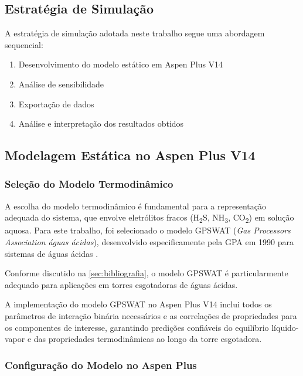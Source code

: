 \documentclass[10pt,a4paper]{article}
\begin{document}
\subsection{Estratégia de Simulação}

A estratégia de simulação adotada neste trabalho segue uma abordagem sequencial:

\begin{enumerate}
  \item Desenvolvimento do modelo estático em Aspen Plus V14
  \item Análise de sensibilidade 
  \item Exportação de dados
  \item Análise e interpretação dos resultados obtidos
\end{enumerate}

\subsection{Modelagem Estática no Aspen Plus V14}\label{sec:modelo_estatico}

\subsubsection{Seleção do Modelo Termodinâmico}

A escolha do modelo termodinâmico é fundamental para a representação adequada do sistema, que envolve eletrólitos fracos (H\textsubscript{2}S, NH\textsubscript{3}, CO\textsubscript{2}) em solução aquosa. Para este trabalho, foi selecionado o modelo GPSWAT (\textit{Gas Processors Association águas ácidas}), desenvolvido especificamente pela GPA em 1990 para sistemas de águas ácidas \cite{gpa1990,kohl1997}.

Conforme discutido na \cref{sec:bibliografia}, o modelo GPSWAT é particularmente adequado para aplicações em torres esgotadoras de águas ácidas.

A implementação do modelo GPSWAT no Aspen Plus V14 inclui todos os parâmetros de interação binária necessários e as correlações de propriedades para os componentes de interesse, garantindo predições confiáveis do equilíbrio líquido-vapor e das propriedades termodinâmicas ao longo da torre esgotadora.

\subsubsection{Configuração do Modelo no Aspen Plus}
\end{document}
